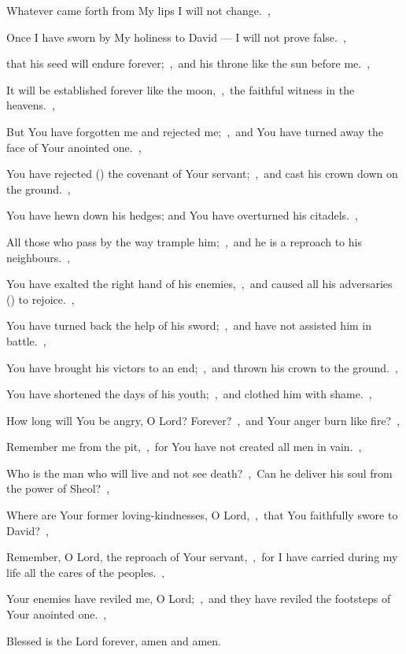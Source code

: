 \documentclass[12pt,twoside,a5paper]{article}
\begin{document}
\begin{halfparskip}
  Whatever came forth from My lips I will not change.~\sep

  Once I have sworn by My holiness to David --- I will not prove false.~\sep

  that his seed will endure forever;~\sep\ and his throne like the sun before me.~\sep

  It will be established forever like the moon,~\sep\ the faithful witness in the heavens.~\sep

  But You have forgotten me and rejected me;~\sep\ and You have turned away the face of Your anointed one.~\sep

  You have rejected () the covenant of Your servant;~\sep\ and cast his crown down on the ground.~\sep

  You have hewn down his hedges; and You have overturned his citadels.~\sep

  All those who pass by the way trample him;~\sep\ and he is a reproach to his neighbours.~\sep

  You have exalted the right hand of his enemies,~\sep\ and caused all his adversaries () to rejoice.~\sep

  You have turned back the help of his sword;~\sep\ and have not assisted him in battle.~\sep

  You have brought his victors to an end;~\sep\ and thrown his crown to the ground.~\sep

  You have shortened the days of his youth;~\sep\ and clothed him with shame.~\sep

  How long will You be angry, O Lord? Forever?~\sep\ and Your anger burn like fire?~\sep

  Remember me from the pit,~\sep\ for You have not created all men in vain.~\sep

  Who is the man who will live and not see death?~\sep\ Can he deliver his soul from the power of Sheol?~\sep

  Where are Your former loving-kindnesses, O Lord,~\sep\ that You faithfully swore to David?~\sep

  Remember, O Lord, the reproach of Your servant,~\sep\ for I have carried during my life all the cares of the peoples.~\sep

  Your enemies have reviled me, O Lord;~\sep\ and they have reviled the footsteps of Your anointed one.~\sep

  Blessed is the Lord forever, amen and amen.
\end{halfparskip}
\end{document}
